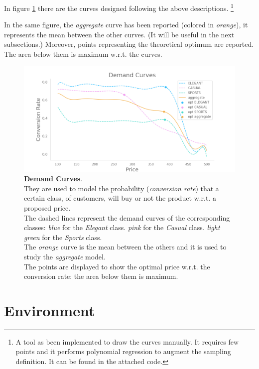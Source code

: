 In figure \ref{demandCurvesFig} there are the curves designed following the above descriptions.
\footnote{A tool as been implemented to draw the curves manually. It requires few points and it performs polynomial regression to augment the sampling definition. It can be found in the attached code.}

In the same figure, the \textit{aggregate} curve has been reported (colored in \textit{orange}), it represents the mean between the other curves. (It will be useful in the next subsections.)
Moreover, points representing the theoretical optimum are reported. The area below them is maximum w.r.t. the curves.

\begin{figure}[H]
	\centering

	\includegraphics[width=1.0\textwidth]{images/demand_curves.png}
	\caption{\textbf{Demand Curves}.\\
		They are used to model the probability (\textit{conversion rate}) that a certain class, of customers, will buy or not the product w.r.t. a proposed price.\\
		The dashed lines represent the demand curves of the corresponding classes:
		\textit{blue} for the \textit{Elegant} class.
		\textit{pink} for the \textit{Casual} class.
		\textit{light green} for the \textit{Sports} class.\\
		The \textit{orange} curve is the mean between the others and it is used to study the \textit{aggregate} model.\\
		The points are displayed to show the optimal price w.r.t. the conversion rate: the area below them is maximum.}
		\label{demandCurvesFig}
\end{figure}

\section{Environment}

